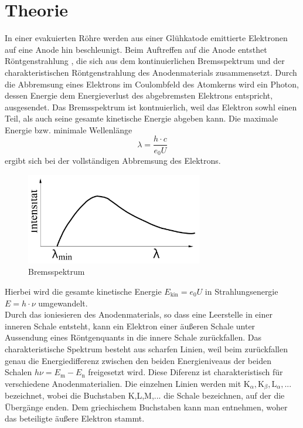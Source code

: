 \section{Theorie}
\label{sec:Theorie}
In einer evakuierten Röhre werden aus einer Glühkatode emittierte Elektronen auf eine Anode hin beschleunigt.
Beim Auftreffen auf die Anode entsthet Röntgenstrahlung , die sich aus dem kontinuierlichen Bremsspektrum
und der charakteristischen Röntgenstrahlung des Anodenmaterials zusammensetzt.
Durch die Abbremsung eines Elektrons im Coulombfeld des Atomkerns wird ein Photon,
dessen Energie dem Energieverlust des abgebremsten Elektrons entspricht,
ausgesendet.
Das Bremsspektrum ist kontnuierlich, weil das Elektron sowhl einen Teil, als auch seine gesamte kinetische Energie abgeben kann.
Die maximale Energie bzw. minimale Wellenlänge
\begin{equation}
    \lambda = \frac{h \cdot c}{e_0 U}
    \label{eqn:gl1}
\end{equation}
ergibt sich bei der vollständigen Abbremsung des Elektrons.
\begin{figure}
    \centering
    \includegraphics[height=4.0cm]{data/abb1.jpg}
    \caption{Bremsspektrum \cite{V602}}
    \label{fig:abb1}
\end{figure}
Hierbei wird die gesamte kinetische Energie $E_{\text{kin}} = e_0 U$ in Strahlungsenergie $E = h \cdot \nu$ umgewandelt.\\
\noindent
Durch das ioniesieren des Anodenmaterials, so dass eine Leerstelle in einer inneren Schale entsteht, kann ein Elektron einer äußeren Schale unter Aussendung eines Röntgenquants in die innere Schale zurückfallen.
Das charakteristische Spektrum besteht aus scharfen Linien, weil beim zurückfallen genau die Energiedifferenz zwischen den beiden Energieniveaus der beiden Schalen $h \nu = E_{\text{m}} - E_{\text{n}}$ freigesetzt wird.
Diese Diferenz ist charakteristisch für verschiedene Anodenmaterialien.
Die einzelnen Linien werden mit $\text{K}_{\alpha}, \text{K}_{\beta}, \text{L}_{\alpha},...$ bezeichnet, wobei die Buchstaben K,L,M,... die Schale bezeichnen, auf der die Übergänge enden.
Dem griechischem Buchstaben kann man entnehmen, woher das beteiligte äußere Elektron stammt.

